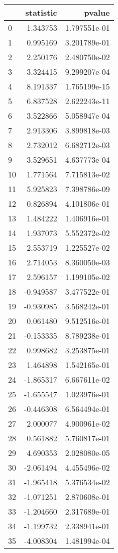 \begin{tabular}{lrr}
\toprule
{} &  statistic &        pvalue \\
\midrule
0  &   1.343753 &  1.797551e-01 \\
1  &   0.995169 &  3.201789e-01 \\
2  &   2.250176 &  2.480750e-02 \\
3  &   3.324415 &  9.299207e-04 \\
4  &   8.191337 &  1.765199e-15 \\
5  &   6.837528 &  2.622243e-11 \\
6  &   3.522866 &  5.058947e-04 \\
7  &   2.913306 &  3.899818e-03 \\
8  &   2.732012 &  6.682712e-03 \\
9  &   3.529651 &  4.637773e-04 \\
10 &   1.771564 &  7.715813e-02 \\
11 &   5.925823 &  7.398786e-09 \\
12 &   0.826894 &  4.101806e-01 \\
13 &   1.484222 &  1.406916e-01 \\
14 &   1.937073 &  5.552372e-02 \\
15 &   2.553719 &  1.225527e-02 \\
16 &   2.714053 &  8.360050e-03 \\
17 &   2.596157 &  1.199105e-02 \\
18 &  -0.949587 &  3.477522e-01 \\
19 &  -0.930985 &  3.568242e-01 \\
20 &   0.061480 &  9.512516e-01 \\
21 &  -0.153335 &  8.789238e-01 \\
22 &   0.998682 &  3.253875e-01 \\
23 &   1.464898 &  1.542165e-01 \\
24 &  -1.865317 &  6.667611e-02 \\
25 &  -1.655547 &  1.023976e-01 \\
26 &  -0.446308 &  6.564494e-01 \\
27 &   2.000077 &  4.900961e-02 \\
28 &   0.561882 &  5.760817e-01 \\
29 &   4.690353 &  2.028080e-05 \\
30 &  -2.061494 &  4.455496e-02 \\
31 &  -1.965418 &  5.376534e-02 \\
32 &  -1.071251 &  2.870608e-01 \\
33 &  -1.204660 &  2.317689e-01 \\
34 &  -1.199732 &  2.338941e-01 \\
35 &  -4.008304 &  1.481994e-04 \\
\bottomrule
\end{tabular}
